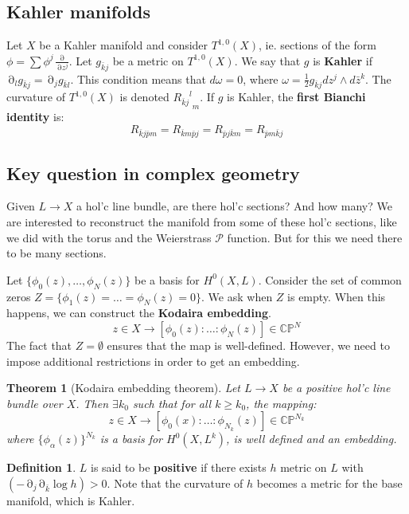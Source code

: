 \documentclass[12 pt]{article}
\DeclareMathOperator {\p} {\partial}
\theoremstyle{plain}
\newtheorem*{thm*}{Theorem}
\theoremstyle{definition}
\newtheorem{defn}{Definition}
\theoremstyle{remark}
\begin{document}
\subsection*{Kahler manifolds}
Let $X$ be a Kahler manifold and consider $T^{1,0}(X)$, ie. sections of the form $\phi = \sum \phi^j \frac{\p}{\p z^j}$. Let $g_{\bar k j}$ be a metric on $T^{1,0} (X)$. We say that $g$ is \textbf{Kahler} if $\p_l g_{\bar k j} = \p_j g_{\bar k l}$. This condition means that $d\omega = 0$, where $\omega = \frac{1}{2} g_{\bar k j} dz^j \wedge d \bar z^k$. The curvature of $T^{1,0}(X)$ is denoted ${{R_{\bar k j}}^l}_m$. If $g$ is Kahler, the \textbf{first Bianchi identity} is:
\[            R_{\bar k j \bar p m} = R_{\bar k m \bar p j} = R_{\bar p j \bar k m} = R_{\bar p m \bar k j}        \]
\subsection*{Key question in complex geometry}
Given $L \to X$ a hol'c line bundle, are there hol'c sections? And how many? We are interested to reconstruct the manifold from some of these hol'c sections, like we did with the torus and the Weierstrass $\mathcal{P}$ function. But for this we need there to be many sections.

Let $\{ \phi_0(z), \dots, \phi_N(z) \}$ be a basis for $H^0(X,L)$. Consider the set of common zeros $Z = \{ \phi_1(z) = \dots = \phi_N (z) = 0\}$. We ask when $Z$ is empty. When this happens, we can construct the \textbf{Kodaira embedding}.
\[       z \in X \longrightarrow [ \phi_0(z) : \dots : \phi_N (z) ]   \in \mathbb{CP}^N    \]
The fact that $Z = \emptyset$ ensures that the map is well-defined. However, we need to impose additional restrictions in order to get an embedding.
\begin{thm*} [Kodaira embedding theorem]
Let $L \to X$ be a positive hol'c line bundle over $X$. Then $\exists k_0$ such that for all $k \geq k_0$, the mapping:
\[         z \in X \longrightarrow [ \phi_0(x) : \dots : \phi_{N_k} (z) ] \in \mathbb{CP}^{N_k}        \]
where $\{ \phi_{\alpha} (z) \}^{N_k}$ is a basis for $H^0(X, L^k)$, is well defined and an embedding.
\end{thm*}
\begin{defn}
$L$ is said to be \textbf{positive} if there exists $h$ metric on $L$ with $(- \p_j \p_{\bar k} \log h) >0$. Note that the curvature of $h$ becomes a metric for the base manifold, which is Kahler.
\end{defn}
\end{document}
